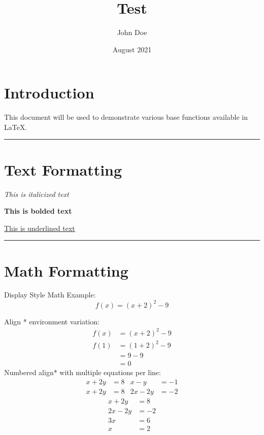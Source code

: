 \documentclass{article} %
\title{Test}
\author{John Doe}
\date{August 2021}
\begin{document}


\section{Introduction}
This document will be used to demonstrate various base functions available in \LaTeX. 

\noindent\rule{\textwidth}{1pt}

\section{Text Formatting}
\textit{This is italicized text} 

\textbf{This is bolded text}

\underline{This is underlined text}

\noindent\rule{\textwidth}{1pt} %

\section{Math Formatting}
Display Style Math Example:
\[f(x)=(x+2)^2-9\] %

Align * environment variation: %
\begin{align*}
f(x)&=(x+2)^2-9\\
f(1)&=(1+2)^2-9\\ 
&=9-9\\
&=0
\end{align*}
\indent Numbered align* with multiple equations per line:
\begin{align}
x+2y&=8 & x-y&=-1\\
x+2y&=8 & 2x-2y&=-2
\end{align}
\begin{align*}
x+2y&=8\\
2x-2y&=-2\\
3x&=6\\
x&=2\\
\end{align*}
\end{document}
